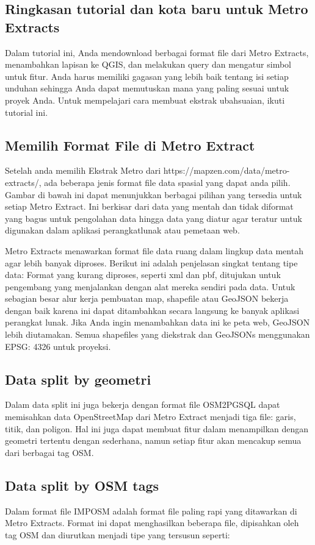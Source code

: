 \subsection{Ringkasan tutorial dan kota baru untuk Metro Extracts}
Dalam tutorial ini, Anda mendownload berbagai format file dari Metro Extracts, menambahkan lapisan ke QGIS, dan melakukan query dan mengatur simbol untuk fitur. Anda harus memiliki gagasan yang lebih baik tentang isi setiap unduhan sehingga Anda dapat memutuskan mana yang paling sesuai untuk proyek Anda. Untuk mempelajari cara membuat ekstrak ubahsuaian, ikuti tutorial ini.

\subsection{Memilih Format File di Metro Extract}
Setelah anda memilih Ekstrak Metro dari https://mapzen.com/data/metro-extracts/, ada beberapa jenis format file data spasial yang dapat
anda pilih. Gambar di bawah ini dapat menunjukkan berbagai pilihan yang tersedia untuk setiap Metro Extract. Ini berkisar dari data yang
mentah dan tidak diformat yang bagus untuk pengolahan data hingga data yang diatur agar teratur untuk digunakan dalam aplikasi perangkatlunak atau pemetaan web.

Metro Extracts menawarkan format file data ruang dalam lingkup data mentah agar lebih banyak diproses. 
Berikut ini adalah penjelasan singkat tentang tipe data: Format yang kurang diproses, seperti xml dan pbf, ditujukan untuk pengembang yang menjalankan dengan alat mereka sendiri pada data. 
Untuk sebagian besar alur kerja pembuatan map, shapefile atau GeoJSON bekerja dengan baik karena ini dapat ditambahkan secara langsung ke banyak aplikasi perangkat lunak. 
Jika Anda ingin menambahkan data ini ke peta web, GeoJSON lebih diutamakan. Semua shapefiles yang diekstrak dan GeoJSONs menggunakan EPSG: 4326 untuk proyeksi.

\subsection{Data split by geometri}
Dalam data split ini juga bekerja dengan format file OSM2PGSQL dapat memisahkan data OpenStreetMap dari Metro Extract menjadi tiga file: garis, titik, dan poligon. 
Hal ini juga dapat membuat fitur dalam menampilkan dengan geometri tertentu dengan sederhana, namun setiap fitur akan mencakup semua dari berbagai tag OSM. 

\subsection{Data split by OSM tags}
Dalam format file IMPOSM adalah format file paling rapi yang ditawarkan di Metro Extracts. 
Format ini dapat menghasilkan beberapa file, dipisahkan oleh tag OSM dan diurutkan menjadi tipe yang tersusun seperti:

